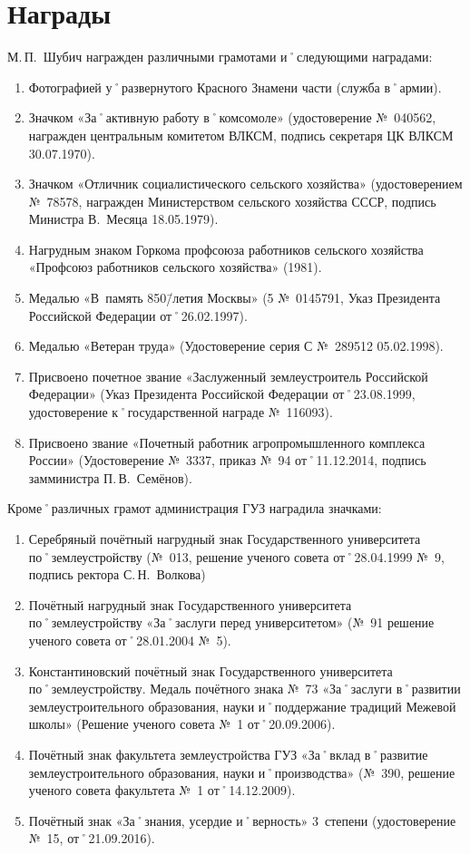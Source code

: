 ﻿\section{Награды}
\noindent М.\,П.~Шубич награжден различными грамотами и˚следующими наградами: 

\begin{enumerate}
	\item Фотографией у˚развернутого Красного Знамени части (служба в˚армии).
	\item Значком «За˚активную работу в˚комсомоле» (удостоверение №~040562, награжден центральным комитетом ВЛКСМ, подпись секретаря ЦК ВЛКСМ 30.07.1970).
	\item Значком «Отличник социалистического сельского хозяйства» (удостоверением №~78578, награжден Министерством сельского хозяйства СССР, подпись Министра В.~Месяца 18.05.1979).
	\item Нагрудным знаком Горкома профсоюза работников сельского хозяйства «Профсоюз работников сельского хозяйства» (1981).
	\item Медалью «В~память 850\=/летия Москвы» (5 №~0145791, Указ Президента Российской Федерации от˚26.02.1997).
	\item Медалью «Ветеран труда» (Удостоверение серия С №~289512 05.02.1998).
	\item Присвоено почетное звание «Заслуженный землеустроитель Российской Федерации» (Указ Президента Российской Федерации от˚23.08.1999, удостоверение к˚государственной награде №~116093).
	\item Присвоено звание «Почетный работник агропромышленного комплекса России» (Удостоверение №~3337, приказ №~94 от˚11.12.2014, подпись замминистра П.\,В.~Семёнов).
\end{enumerate}

\noindent Кроме˚различных грамот администрация ГУЗ наградила значками:
\begin{enumerate}	
	\item Серебряный почётный нагрудный знак Государственного университета по˚землеустройству (№~013, решение ученого совета от˚28.04.1999 №~9, подпись ректора С.\,Н.~Волкова) 
	\item Почётный нагрудный знак Государственного университета по˚землеустройству «За˚заслуги перед университетом» (№~91 решение ученого совета от˚28.01.2004 №~5).
	\item Константиновский почётный знак Государственного университета по˚землеустройству. Медаль почётного знака №~73 «За˚заслуги в˚развитии землеустроительного образования, науки и˚поддержание традиций Межевой школы» (Решение ученого совета №~1 от˚20.09.2006).
	\item Почётный знак факультета землеустройства ГУЗ «За˚вклад в˚развитие землеустроительного образования, науки и˚производства» (№~390, решение ученого совета факультета №~1 от˚14.12.2009).
	\item Почётный знак «За˚знания, усердие и˚верность» 3~степени (удостоверение №~15, от˚21.09.2016). 
\end{enumerate}
